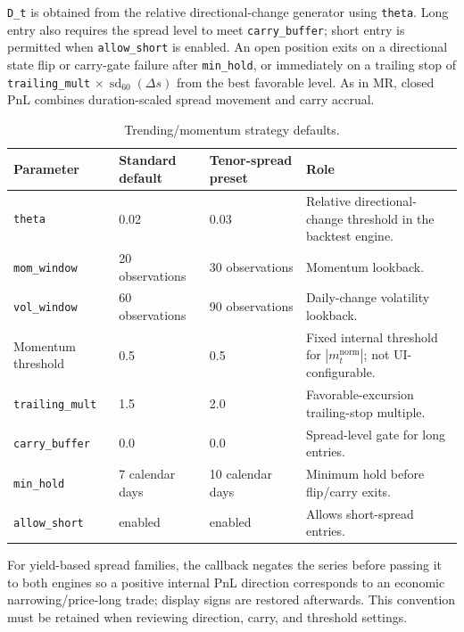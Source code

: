 \texttt{D\_t} is obtained from the relative directional-change generator using \texttt{theta}.
Long entry also requires the spread level to meet \texttt{carry\_buffer}; short entry is
permitted when \texttt{allow\_short} is enabled. An open position exits on a directional
state flip or carry-gate failure after \texttt{min\_hold}, or immediately on a trailing
stop of \texttt{trailing\_mult} $\times\, \operatorname{sd}_{60}(\Delta s)$ from the best favorable level.
As in MR, closed PnL combines duration-scaled spread movement and carry accrual.

\begin{table}[htbp]
\centering
\small
\setlength{\tabcolsep}{6pt}
\renewcommand{\arraystretch}{1.2}
\begin{tabular}{p{} p{} p{} p{}}
\hline
\textbf{Parameter} & \textbf{Standard default} & \textbf{Tenor-spread preset} & \textbf{Role} \\
\hline
\texttt{theta} & 0.02 & 0.03 & Relative directional-change threshold in the backtest engine. \\
\texttt{mom\_window} & 20 observations & 30 observations & Momentum lookback. \\
\texttt{vol\_window} & 60 observations & 90 observations & Daily-change volatility lookback. \\
Momentum threshold & 0.5 & 0.5 & Fixed internal threshold for $\left|m_t^{\mathrm{norm}}\right|$; not UI-configurable. \\
\texttt{trailing\_mult} & 1.5 & 2.0 & Favorable-excursion trailing-stop multiple. \\
\texttt{carry\_buffer} & 0.0 & 0.0 & Spread-level gate for long entries. \\
\texttt{min\_hold} & 7 calendar days & 10 calendar days & Minimum hold before flip/carry exits. \\
\texttt{allow\_short} & enabled & enabled & Allows short-spread entries. \\
\hline
\end{tabular}
\caption{Trending/momentum strategy defaults.}
\label{tab:pairs-trend-defaults}
\end{table}

For yield-based spread families, the callback negates the series before passing it
to both engines so a positive internal PnL direction corresponds to an economic
narrowing/price-long trade; display signs are restored afterwards. This convention
must be retained when reviewing direction, carry, and threshold settings.

